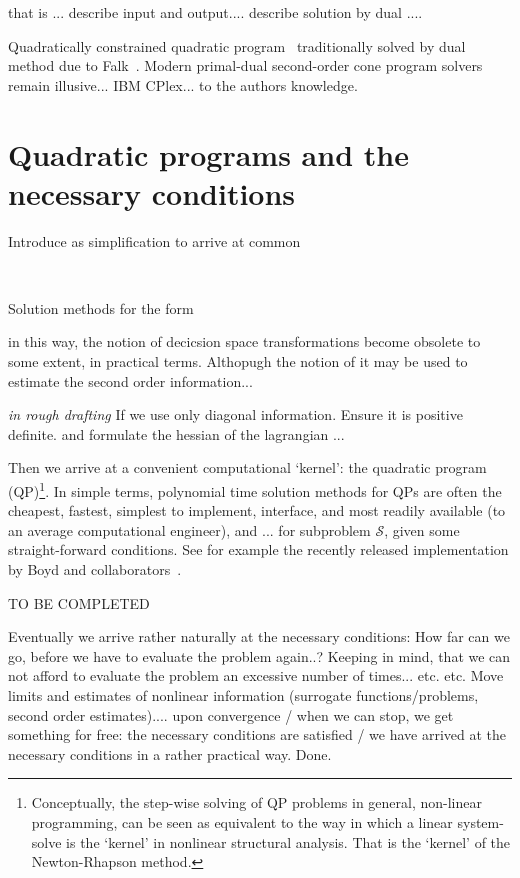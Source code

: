 \documentclass[11pt]{article}
\begin{document}
that is ... describe input and output.... describe solution by dual .... 


Quadratically constrained quadratic program~\cite{boyd2004convex} traditionally solved by dual method due to Falk~\cite{falk1969lagrange}. Modern primal-dual second-order cone program solvers remain illusive... IBM CPlex... \cite{cplex2009v12} to the authors knowledge.

\section{Quadratic programs and the necessary conditions}

Introduce as simplification to arrive at common 

~\cite{osqp}

Solution methods for the form

in this way, the notion of decicsion space transformations become obsolete to some extent, in practical terms. Althopugh the notion of it may be used to estimate the second order information... 

\emph{in rough drafting}
If we use only diagonal information. Ensure it is positive definite. and formulate the hessian of the lagrangian ... 

Then we arrive at a convenient computational `kernel': the quadratic program (QP)\footnote{Conceptually, the step-wise solving of QP problems in general, non-linear programming, can be seen as equivalent to the way in which a linear system-solve is the `kernel' in nonlinear structural analysis. That is the `kernel' of the Newton-Rhapson method.}. In simple terms, polynomial time solution methods for QPs are often the cheapest, fastest, simplest to implement, interface, and most readily available (to an average computational engineer), and ... for subproblem $\mathcal{S}$, given some straight-forward conditions. See for example the recently released implementation by Boyd and collaborators~\cite{osqp}.  

TO BE COMPLETED

Eventually we arrive rather naturally at the necessary conditions: How far can we go, before we have to evaluate the problem again..? Keeping in mind, that we can not afford to evaluate the problem an excessive number of times... etc. etc. Move limits and estimates of nonlinear information (surrogate functions/problems, second order estimates).... upon convergence / when we can stop, we get something for free: the necessary conditions are satisfied / we have arrived at the necessary conditions in a rather practical way. Done.
\end{document}
